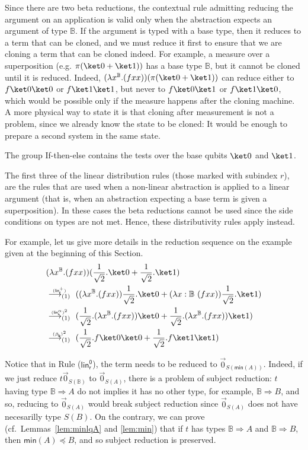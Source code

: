 \documentclass[preprint]{elsarticle}
\newcommand\lra[1][1]{\longrightarrow_{\left(#1\right)}}
\newcommand\B{\ensuremath{\mathbb B}}
\newcommand\pair[2]{({#1}+{#2})}
\newcommand\s[1]{\ensuremath{\mathsf{#1}}}
\newcommand\red[2][1]{\overset{\scriptscriptstyle\smash{#2}\vphantom{x}}{\lra[#1]}\ }
\newcommand\z[1][A]{\vec 0_{S(#1)}}
\newcommand\rbetab{(\s{\beta_b})}
\newcommand\rlinr{(\s{lin^+_r})}
\newcommand\rlinscalr{(\s{lin^\alpha_r})}
\newcommand\rlinzr{(\s{lin^0_r})}
\begin{document}
Since there are two beta reductions, the contextual rule admitting reducing the
argument on an application is valid only when the abstraction expects an
argument of type $\B$. If the argument is typed with a base type, then it
reduces to a term that can be cloned, and we must reduce it first to ensure that
we are cloning a term that can be cloned indeed. For example, a measure over a
superposition (e.g. $\pi\pair{\ket 0}{\ket 1})$ has a base type $\B$, but it
cannot be cloned until it is reduced. Indeed, $(\lambda
x^{\B}.(fxx))(\pi\pair{\ket 0}{\ket 1})$ can reduce either to $f\ket 0\ket 0$ or
$f\ket 1\ket 1$, but never to $f\ket 0\ket 1$ or $f\ket 1\ket 0$, which would be
possible only if the measure happens after the cloning machine. A more physical
way to state it is that cloning after measurement is not a problem, since we
already know the state to be cloned: It would be enough to prepare a second
system in the same state.

The group If-then-else contains the tests over the base qubits $\ket 0$ and
$\ket 1$.

The first three of the linear distribution rules (those marked with subindex
$r$), are the rules that are used when a non-linear abstraction is applied to a
linear argument (that is, when an abstraction expecting a base term is given a
superposition). In these cases the beta reductions cannot be used since the side
conditions on types are not met. Hence, these distributivity rules apply
instead.

For example, let us give more details in the reduction sequence on the example
given at the beginning of this Section.
\begin{align*}
  &(\lambda x^{\B}.(fxx))\pair{\frac 1{\sqrt 2}.\ket
    0}{\frac 1{\sqrt 2}.\ket 1}\\
  &\red\rlinr
    \pair{(\lambda x^{\B}.(fxx))\frac 1{\sqrt 2}.\ket 0}{(\lambda
    x:\B~(fxx))\frac 1{\sqrt 2}.\ket 1}\\
  &\red{\rlinscalr^2}
    \pair{\frac 1{\sqrt 2}.(\lambda x^{\B}.(fxx))\ket 0}{\frac 1{\sqrt 2}.(\lambda x^{\B}.(fxx))\ket 1}\\
  &\red{\rbetab^2}
    \pair{\frac 1{\sqrt 2}.f\ket 0\ket 0}{\frac 1{\sqrt 2}.f\ket 1\ket 1}
\end{align*}

Notice that in Rule \rlinzr, the term needs to be reduced to
$\z[\mathsf{min}(A)]$. Indeed, if we just reduce $t\z[\B]$ to $\z$, there is a
problem of subject reduction: $t$ having type $\B\Rightarrow A$ do not implies
it has no other type, for example, $\B\Rightarrow B$, and so, reducing to $\z$
would break subject reduction since $\z$ does not have necesarilly type $S(B)$.
On the contrary, we can prove (cf.~Lemmas~\ref{lem:minlqA} and \ref{lem:min}) that if $t$ has types $\B\Rightarrow A$ and
$\B\Rightarrow B$, then $\mathsf{min}(A)\preceq B$, and so subject reduction is preserved.
\end{document}
